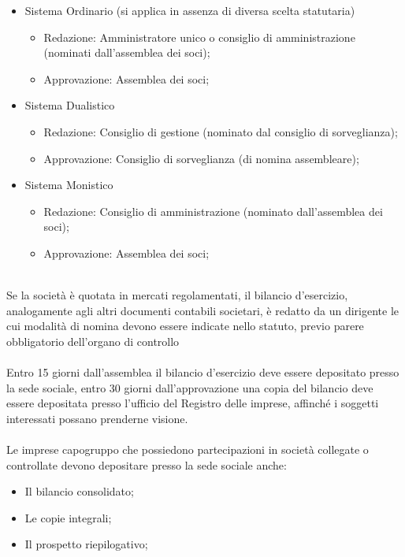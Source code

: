 \documentclass{report}
\begin{document}
\begin{itemize}
  \item{Sistema Ordinario (si applica in assenza di diversa scelta statutaria)\\
    \begin{itemize}
      \item{Redazione: Amministratore unico o consiglio di amministrazione (nominati dall'assemblea dei soci);}
      \item{Approvazione: Assemblea dei soci;}
    \end{itemize}
  }
  \item{Sistema Dualistico \\
    \begin{itemize}
      \item{Redazione: Consiglio di gestione (nominato dal consiglio di sorveglianza);}
      \item{Approvazione: Consiglio di sorveglianza (di nomina assembleare);}
    \end{itemize}
  }
  \item{Sistema Monistico \\
    \begin{itemize}
      \item{Redazione: Consiglio di amministrazione (nominato dall'assemblea dei soci);}
      \item{Approvazione: Assemblea dei soci;}
    \end{itemize}
  }
\end{itemize}
\\
Se la società è quotata in mercati regolamentati, il bilancio d'esercizio, analogamente agli altri documenti contabili societari, è redatto da un dirigente le cui modalità di nomina devono essere indicate nello statuto, previo parere obbligatorio dell'organo di controllo
\\
\\
Entro 15 giorni dall'assemblea il bilancio d'esercizio deve essere depositato presso la sede sociale, entro 30 giorni dall'approvazione una copia del bilancio deve essere depositata presso l'ufficio del Registro delle imprese, affinché i soggetti interessati possano prenderne visione.
\\
\\
Le imprese capogruppo che possiedono partecipazioni in società collegate o controllate devono depositare presso la sede sociale anche:
\\
\begin{itemize}
  \item{Il bilancio consolidato;}
  \item{Le copie integrali;}
  \item{Il prospetto riepilogativo;}
\end{itemize}
\end{document}
